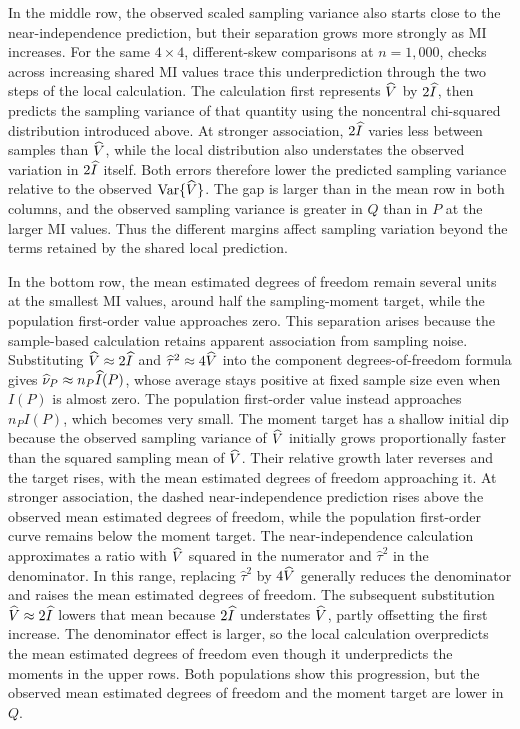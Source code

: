 In the middle row, the observed scaled sampling variance also starts
close to the near-independence prediction, but their separation grows
more strongly as MI increases. For the same \(4\times4\), different-skew
comparisons at \(n=1{,}000\), checks across increasing shared MI values
trace this underprediction through the two steps of the local calculation.
The calculation first
represents \(\widehat V\) by \(2\widehat I\), then predicts the sampling variance
of that quantity using the noncentral chi-squared distribution introduced
above. At stronger association,
\(2\widehat I\) varies less between samples than \(\widehat V\), while the local
distribution also understates the observed variation in \(2\widehat I\)
itself. Both errors therefore lower the predicted sampling variance
relative to the observed \(\operatorname{Var}\{\widehat V\}\).
The gap is larger than in the mean row in both columns, and the observed
sampling variance is greater in \(Q\) than in \(P\) at the larger MI
values.
Thus the different margins affect sampling variation beyond the terms
retained by the shared local prediction.

In the bottom row, the mean estimated degrees of freedom remain several
units at the smallest MI values, around half the sampling-moment target,
while the population first-order value approaches zero. This separation
arises because the sample-based calculation retains apparent association
from sampling noise. Substituting \(\widehat V\approx2\widehat I\) and
\(\widehat\tau^2\approx4\widehat V\) into the component degrees-of-freedom
formula gives
\(\widehat\nu_P\approx n_P\widehat I(P)\), whose average stays positive at
fixed sample size even when \(I(P)\) is almost zero. The population
first-order value instead approaches \(n_PI(P)\), which becomes very
small. The moment target has a shallow initial dip because the observed
sampling variance of \(\widehat V\) initially grows proportionally faster than
the squared sampling mean of \(\widehat V\). Their relative growth later reverses
and the target rises, with the mean estimated degrees of freedom approaching
it. At stronger
association, the dashed near-independence prediction rises above the
observed mean estimated degrees of freedom, while the population
first-order curve remains below the moment target. The near-independence
calculation approximates a ratio with \(\widehat V\) squared in the numerator
and \(\widehat\tau^2\) in the denominator. In this range, replacing
\(\widehat\tau^2\) by \(4\widehat V\) generally reduces the denominator
and raises the mean estimated degrees of freedom. The subsequent
substitution \(\widehat V\approx2\widehat I\) lowers that mean because
\(2\widehat I\) understates \(\widehat V\), partly offsetting the first
increase. The denominator effect is larger, so the local calculation
overpredicts the mean estimated degrees of freedom even though it
underpredicts the moments in the upper rows. Both populations show this progression,
but the observed mean estimated degrees of freedom and the moment target
are lower in \(Q\).

